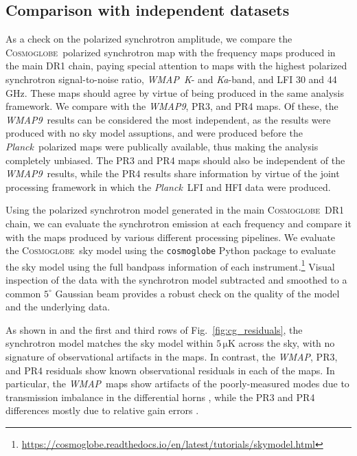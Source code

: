 \documentclass[twocolumn]{../../common/aa}
\def\WMAP{\emph{WMAP}}
\def\WMAPnine{\emph{WMAP9}}
\def\Planck{\emph{Planck}}
\newcommand{\cosmoglobe}{\textsc{Cosmoglobe}}
\newcommand{\K}[0]{\textit K}
\newcommand{\Ka}[0]{\textit{Ka}}
\begin{document}
\subsection{Comparison with independent datasets}

As a check on the polarized synchrotron amplitude, we compare the \cosmoglobe\ polarized synchrotron map with the frequency maps produced in the main DR1 chain, paying special attention to maps with the highest polarized synchrotron signal-to-noise ratio, \WMAP\ \K- and \Ka-band, and LFI 30 and 44\,GHz. These maps should agree by virtue of being produced in the same analysis framework. We compare with the \WMAPnine, PR3, and PR4 maps. Of these, the \WMAPnine\ results can be considered the most independent, as the results were produced with no sky model assuptions, and were produced before the \Planck\ polarized maps were publically available, thus making the analysis completely unbiased. The PR3 and PR4 maps should also be independent of the \WMAPnine\ results, while the PR4 results share information by virtue of the joint processing framework in which the \Planck\ LFI and HFI data were produced.

Using the polarized synchrotron model generated in the main \cosmoglobe\ DR1 chain, we can evaluate the synchrotron emission at each frequency and compare it with the maps produced by various different processing pipelines. We evaluate the \cosmoglobe\ sky model using the \texttt{cosmoglobe} Python package to evaluate the sky model using the full bandpass information of each instrument.\footnote{\url{https://cosmoglobe.readthedocs.io/en/latest/tutorials/skymodel.html}} Visual inspection of the data with the synchrotron model subtracted and smoothed to a common $5^\circ$ Gaussian beam provides a robust check on the quality of the model and the underlying data.

As shown in \citet{watts2023_dr1} and the first and third rows of Fig.~\ref{fig:cg_residuals}, the synchrotron model matches the sky model within $5\,\mathrm{\mu K}$ across the sky, with no signature of observational artifacts in the maps. In contrast, the \WMAP, PR3, and PR4 residuals show known observational residuals in each of the maps. In particular, the \WMAP\ maps show artifacts of the poorly-measured modes due to transmission imbalance in the differential horns \citep{jarosik2007,bennett2012}, while the PR3 and PR4 differences mostly due to relative gain errors \citep{planck2016-l02,planck2020-LVII}.
\end{document}
